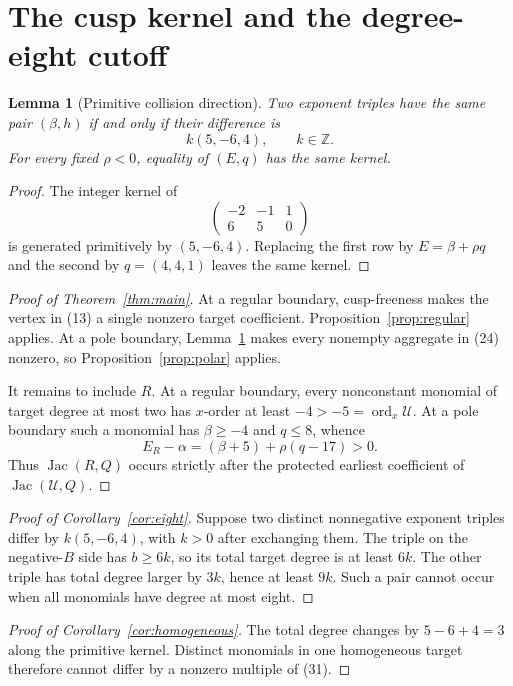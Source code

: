 \documentclass[11pt]{article}
\newtheorem{lemma}[theorem]{Lemma}
\theoremstyle{remark}
\newcommand{\Z}{\mathbb Z}
\newcommand{\Jac}{\operatorname{Jac}}
\newcommand{\ord}{\operatorname{ord}}
\newcommand{\cU}{\mathcal U}
\begin{document}
\section{The cusp kernel and the degree-eight cutoff}

\begin{lemma}[Primitive collision direction]
\label{lem:kernel}
Two exponent triples have the same pair \((\beta,h)\) if and only if
their difference is
\[
k(5,-6,4),\qquad k\in\Z.
\tag{31}
\]
For every fixed \(\rho<0\), equality of \((E,q)\) has the same
kernel.
\end{lemma}

\begin{proof}
The integer kernel of
\[
\begin{pmatrix}-2&-1&1\\6&5&0\end{pmatrix}
\]
is generated primitively by \((5,-6,4)\).  Replacing the first row
by \(E=\beta+\rho q\) and the second by \(q=(4,4,1)\) leaves the
same kernel.
\end{proof}

\begin{proof}[Proof of Theorem~\ref{thm:main}]
At a regular boundary, cusp-freeness makes the vertex in (13) a
single nonzero target coefficient.  Proposition~\ref{prop:regular}
applies.  At a pole boundary, Lemma~\ref{lem:kernel} makes every
nonempty aggregate in (24) nonzero, so
Proposition~\ref{prop:polar} applies.

It remains to include \(R\).  At a regular boundary, every
nonconstant monomial of target degree at most two has \(x\)-order at
least \(-4>-5=\ord_x\cU\).  At a pole boundary such a monomial has
\(\beta\ge-4\) and \(q\le8\), whence
\[
E_R-\alpha=(\beta+5)+\rho(q-17)>0.
\tag{32}
\]
Thus \(\Jac(R,Q)\) occurs strictly after the protected earliest
coefficient of \(\Jac(\cU,Q)\).
\end{proof}

\begin{proof}[Proof of Corollary~\ref{cor:eight}]
Suppose two distinct nonnegative exponent triples differ by
\(k(5,-6,4)\), with \(k>0\) after exchanging them.  The triple on
the negative-\(B\) side has \(b\ge6k\), so its total target degree
is at least \(6k\).  The other triple has total degree larger by
\(3k\), hence at least \(9k\).  Such a pair cannot occur when all
monomials have degree at most eight.
\end{proof}

\begin{proof}[Proof of Corollary~\ref{cor:homogeneous}]
The total degree changes by \(5-6+4=3\) along the primitive kernel.
Distinct monomials in one homogeneous target therefore cannot differ
by a nonzero multiple of (31).
\end{proof}
\end{document}
